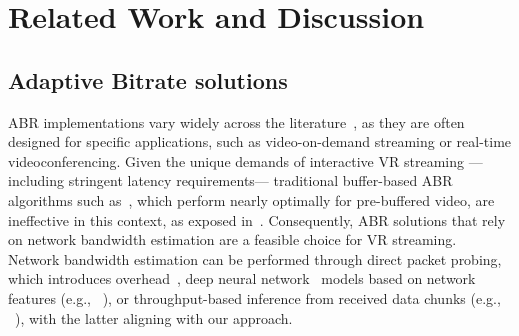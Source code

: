\section{Related Work and Discussion}
\subsection{Adaptive Bitrate solutions}

ABR implementations vary widely across the literature~\cite{ABR_survey}, as they are often designed for specific applications, such as video-on-demand streaming or real-time videoconferencing. Given the unique demands of interactive VR streaming ---including stringent latency requirements--- traditional buffer-based ABR algorithms such as~\cite{buffer-based-netflix, BOLA}, which perform nearly optimally for pre-buffered video, are ineffective in this context, as exposed in~\cite{korneev2024model}. Consequently, ABR solutions that rely on network bandwidth estimation are a feasible choice for VR streaming. Network bandwidth estimation can be performed through direct packet probing, which introduces overhead~\cite{curtis2001review}, deep neural network~\cite{bengio2017deep} models based on network features (e.g., ~\cite{gottipati2024offlineonlinelearningrealtime}), or throughput-based inference from received data chunks (e.g., ~\cite{jiang2012improving, liubogoshchev2021everest, korneev2024model}), with the latter aligning with our approach.

